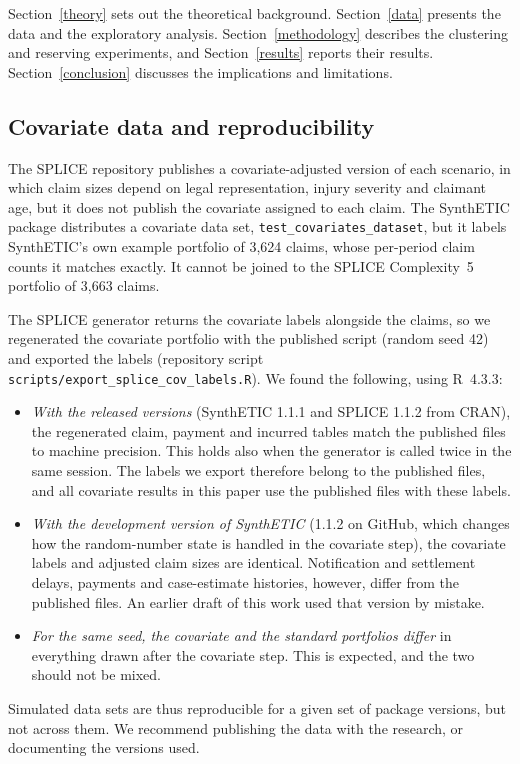\documentclass[
    a4paper,
    man,
    floatsintext
]{style}
\begin{document}
Section~\ref{theory} sets out the theoretical background. Section~\ref{data} presents the data and the exploratory analysis. Section~\ref{methodology} describes the clustering and reserving experiments, and Section~\ref{results} reports their results. Section~\ref{conclusion} discusses the implications and limitations.







\printbibliography
\begin{appendices}



\section{Covariate data and reproducibility}
\label{app:cov}

The SPLICE repository publishes a covariate-adjusted version of each scenario, in which claim sizes depend on legal representation, injury severity and claimant age, but it does not publish the covariate assigned to each claim. The SynthETIC package distributes a covariate data set, \texttt{test\_covariates\_dataset}, but it labels SynthETIC's own example portfolio of 3,624 claims, whose per-period claim counts it matches exactly. It cannot be joined to the SPLICE Complexity~5 portfolio of 3,663 claims.

The SPLICE generator returns the covariate labels alongside the claims, so we regenerated the covariate portfolio with the published script (random seed 42) and exported the labels (repository script \texttt{scripts/export\_splice\_cov\_labels.R}). We found the following, using R~4.3.3:
\begin{itemize}[leftmargin=*]
\item \emph{With the released versions} (SynthETIC 1.1.1 and SPLICE 1.1.2 from CRAN), the regenerated claim, payment and incurred tables match the published files to machine precision. This holds also when the generator is called twice in the same session. The labels we export therefore belong to the published files, and all covariate results in this paper use the published files with these labels.
\item \emph{With the development version of SynthETIC} (1.1.2 on GitHub, which changes how the random-number state is handled in the covariate step), the covariate labels and adjusted claim sizes are identical. Notification and settlement delays, payments and case-estimate histories, however, differ from the published files. An earlier draft of this work used that version by mistake.
\item \emph{For the same seed, the covariate and the standard portfolios differ} in everything drawn after the covariate step. This is expected, and the two should not be mixed.
\end{itemize}
Simulated data sets are thus reproducible for a given set of package versions, but not across them. We recommend publishing the data with the research, or documenting the versions used.


\end{appendices}
\end{document}
